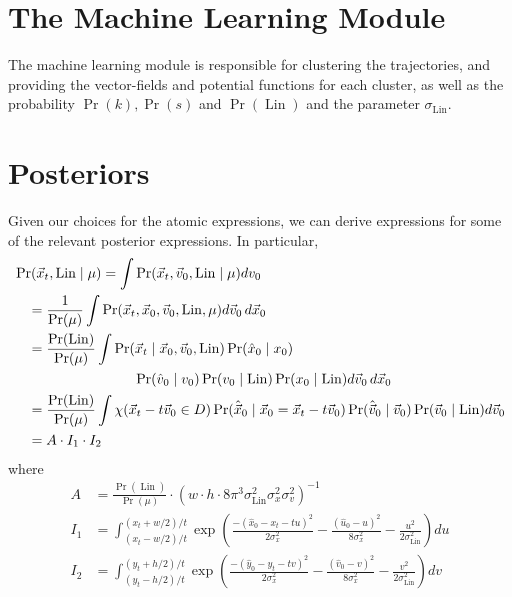 \documentclass[12pt]{amsart}
\DeclareMathOperator{\Lin}{Lin}
\begin{document}
\section{The Machine Learning Module}
\label{app:learning}
The machine learning module is responsible for clustering the trajectories, and providing the vector-fields and potential functions for each cluster, as well as the probability $\Pr(k), \Pr(s)$ and $\Pr( \Lin)$ and the parameter $\sigma_{\Lin}$.

\section{Posteriors}
Given our choices for the atomic expressions, we can derive expressions for some of the relevant posterior expressions.
In particular,
\begin{align*}
	&\Pr( \vec{x}_t , \Lin \mid \mu ) = \int \Pr( \vec{x}_t, \vec{v}_0 , \Lin \mid \mu) dv_0 \\
	&\quad= \frac{1}{ \Pr(\mu) } \int \Pr( \vec{x}_t, \vec{x}_0, \vec{v}_0 , \Lin, \mu) d\vec{v}_0\, d\vec{x}_0 \\
	&\quad= \frac{\Pr(\Lin)}{ \Pr(\mu) } \int \Pr(\vec{x}_t \mid \vec{x}_0, \vec{v}_0 , \Lin ) \Pr( \hat{x}_0 \mid x_0)\\
	&\hspace{20ex} \Pr(\hat{v}_0 \mid v_0 ) \Pr( v_0 \mid \Lin ) \Pr( x_0 \mid \Lin )d\vec{v}_0\, d\vec{x}_0 \\
	&\quad= \frac{\Pr(\Lin)}{ \Pr(\mu) } \int \chi( \vec{x}_t - t\vec{v}_0 \in D) \Pr( \hat{\vec{x}}_0 \mid \vec{x}_0 = \vec{x}_t - t \vec{v}_0 ) \Pr(\hat{\vec{v}}_0 \mid \vec{v}_0 ) \Pr( \vec{v}_0 \mid \Lin ) d\vec{v}_0 \\
	&\quad= A \cdot I_1 \cdot I_2
\end{align*}
where
\begin{align*}
	A &= \frac{\Pr(\Lin)}{ \Pr(\mu) }  \cdot (w\cdot h \cdot 8\pi^3 \sigma_{\Lin}^2 \sigma_x^2 \sigma_v^2 )^{-1} \\
	I_1 &=  \int_{(x_t-w/2)/t}^{(x_t+w/2)/t}   \exp \left( \frac{-(\hat{x}_0 - x_t - t u )^2}{2 \sigma_x^2} -  \frac{(\hat{u}_0 - u)^2}{8\sigma_x^2} - \frac{ u^2}{2 \sigma_{\Lin}^2} \right) du \\
	I_2 &=  \int_{(y_t-h/2)/t}^{(y_t+h/2)/t}   \exp \left( \frac{-(\hat{y}_0 - y_t - t v )^2}{2 \sigma_x^2} -  \frac{(\hat{v}_0 - v)^2}{8\sigma_x^2} - \frac{ v^2}{2 \sigma_{\Lin}^2} \right) dv
\end{align*}
\end{document}
